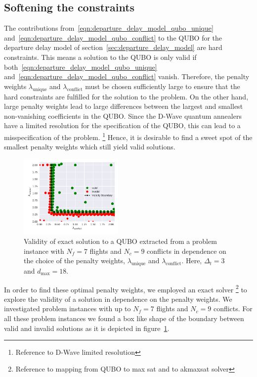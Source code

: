 \subsection{Softening the constraints}
The contributions from~\eqref{eqn:departure_delay_model_qubo_unique} and~\eqref{eqn:departure_delay_model_qubo_conflict} to the QUBO for the departure delay model of section~\ref{sec:departure_delay_model} are hard constraints. %
This means a solution to the QUBO is only valid if both~\eqref{eqn:departure_delay_model_qubo_unique} and~\eqref{eqn:departure_delay_model_qubo_conflict} vanish.
Therefore, the penalty weights $\lambda_\text{unique}$ and $\lambda_\text{conflict}$ must be chosen sufficiently large to ensure that the hard constraints are fulfilled for the solution to the problem.
On the other hand, large penalty weights lead to large differences between the largest and smallest non-vanishing coefficients in the QUBO.\@
Since the D-Wave quantum annealers have a limited resolution for the specification of the QUBO, this can lead to a misspecification of the problem.
\footnote{Reference to D-Wave limited resolution}
Hence, it is desirable to find a sweet spot of the smallest penalty weights which still yield valid solutions.

\begin{figure}[htpb]
    \centering
    \includegraphics[width=0.45\textwidth]{./pics/validity_boundary_example.pdf}
    \caption{Validity of exact solution to a QUBO extracted from a problem instance with $N_f=7$ flights and $N_c=9$ conflicts in dependence on the choice of the penalty weights, $\lambda_\text{unique}$ and $\lambda_\text{conflict}$. Here, $\Delta_t=3$ and $d_\text{max}=18$.}
\label{fig:penalty_weights}
\end{figure}

In order to find these optimal penalty weights, we employed an exact solver
\footnote{Reference to mapping from QUBO to max sat and to akmaxsat solver} to explore the validity of a solution in dependence on the penalty weights.
We investigated problem instances with up to $N_f=7$ flights and $N_c=9$ conflicts.
For all these problem instances we found a box like shape of the boundary between valid and invalid solutions as it is depicted in figure~\ref{fig:penalty_weights}.

